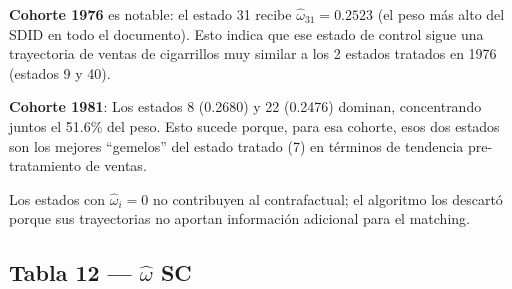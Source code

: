 \documentclass[11pt, a4paper]{article}
\begin{document}
\begin{interpretacion}
\textbf{Cohorte 1976} es notable: el estado 31 recibe $\hat{\omega}_{31}=0.2523$
(el peso más alto del SDID en todo el documento). Esto indica que ese estado
de control sigue una trayectoria de ventas de cigarrillos muy similar a los
2 estados tratados en 1976 (estados 9 y 40).

\medskip
\textbf{Cohorte 1981}: Los estados 8 (0.2680) y 22 (0.2476) dominan,
concentrando juntos el 51.6\% del peso. Esto sucede porque, para esa cohorte,
esos dos estados son los mejores ``gemelos'' del estado tratado (7)
en términos de tendencia pre-tratamiento de ventas.

\medskip
Los estados con $\hat{\omega}_i=0$ no contribuyen al contrafactual;
el algoritmo los descartó porque sus trayectorias no aportan información
adicional para el matching.
\end{interpretacion}

\subsection{Tabla 12 — $\hat{\omega}$ SC}
\end{document}
